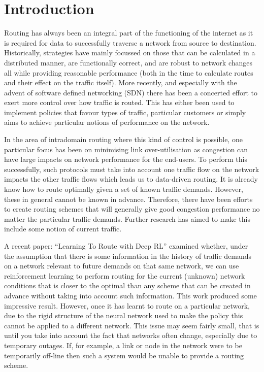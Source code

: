 \chapter{Introduction}

\setcounter{page}{1}

Routing has always been an integral part of the functioning of the internet as it is required for data to successfully traverse a network from source to destination. Historically, strategies have mainly focussed on those that can be calculated in a distributed manner, are functionally correct, and are robust to network changes all while providing reasonable performance (both in the time to calculate routes and their effect on the traffic itself). More recently, and especially with the advent of software defined networking (SDN) there has been a concerted effort to exert more control over how traffic is routed. This has either been used to implement policies that favour types of traffic, particular customers or simply aims to achieve particular notions of performance on the network.

In the area of intradomain routing where this kind of control is possible, one particular focus has been on minimising link over-utilisation as congestion can have large impacts on network performance for the end-users. To perform this successfully, such protocols must take into account one traffic flow on the network impacts the other traffic flows which leads us to data-driven routing. It is already know how to route optimally given a set of known traffic demands. However, these in general cannot be known in advance. Therefore, there have been efforts to create routing schemes that will generally give good congestion performance no matter the particular traffic demands. Further research has aimed to make this include some notion of current traffic.

A recent paper: ``Learning To Route with Deep RL''\cite{valadarsky2017learning} examined whether, under the assumption that there is some information in the history of traffic demands on a network relevant to future demands on that same network, we can use reinforcement learning to perform routing for the current (unknown) network conditions that is closer to the optimal than any scheme that can be created in advance without taking into account such information. This work produced some impressive result. However, once it has learnt to route on a particular network, due to the rigid structure of the neural network used to make the policy this cannot be applied to a different network. This issue may seem fairly small, that is until you take into account the fact that networks often change, especially due to temporary outages. If, for example, a link or node in the network were to be temporarily off-line then such a system would be unable to provide a routing scheme.

